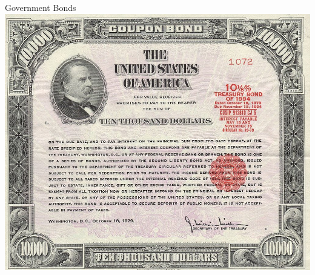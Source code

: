 \documentclass[handout]{beamer}
\begin{document}

\begin{frame}{\LARGE Government Bonds}
    \centering
\includegraphics[width=\textwidth,height=0.8\textheight,keepaspectratio]{1979-10000-Treasury-Bond.jpg}
\end{frame}
\end{document}
